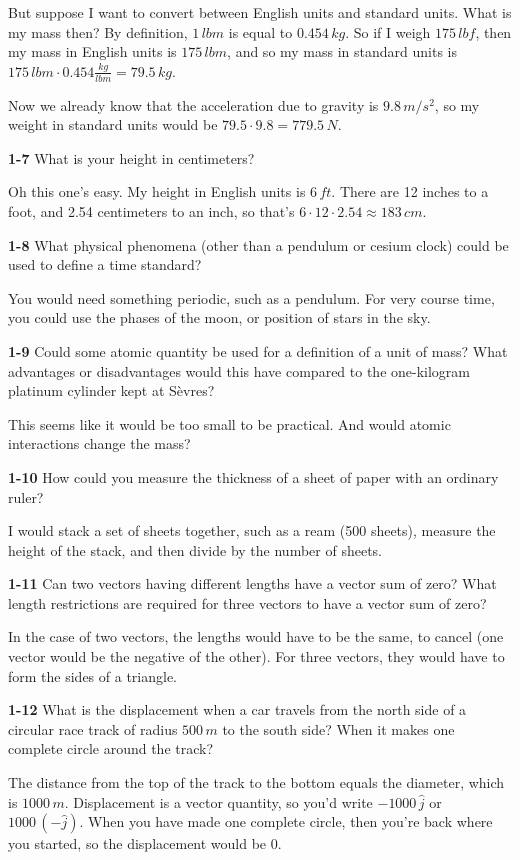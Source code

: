\documentclass{amsart}
\begin{document}
But suppose I want to convert between English units and standard units.
What is my mass then?
By definition, $1 \, lbm$ is equal to $0.454 \, kg$.
So if I weigh $175 \, lbf$, then my mass in English units is $175 \, lbm$,
and so my mass in standard units is $175 \, lbm \cdot 0.454 \frac{kg}{lbm} = 79.5 \, kg$.

Now we already know that the acceleration due to gravity is $9.8 \, m/s^{2}$,
so my weight in standard units would be $79.5 \cdot 9.8 = 779.5 \, N$.

\textbf{1-7} What is your height in centimeters?

Oh this one's easy.  My height in English units is $6 \, ft$.
There are 12 inches to a foot, and 2.54 centimeters to an inch,
so that's $6 \cdot 12 \cdot 2.54 \approx 183 \, cm$.

\textbf{1-8} What physical phenomena (other than a pendulum or cesium clock)
could be used to define a time standard?

You would need something periodic, such as a pendulum.  For very course time,
you could use the phases of the moon, or position of stars in the sky.

\textbf{1-9} Could some atomic quantity be used for a definition of a unit of mass?
What advantages or disadvantages would this have compared to the one-kilogram platinum
cylinder kept at S\`{e}vres?

This seems like it would be too small to be practical.
And would atomic interactions change the mass?

\textbf{1-10} How could you measure the thickness of a sheet of paper with an ordinary ruler?

I would stack a set of sheets together, such as a ream (500 sheets), measure the height of the stack,
and then divide by the number of sheets.

\textbf{1-11} Can two vectors having different lengths have a vector sum of zero?
What length restrictions are required for three vectors to have a vector sum of zero?

In the case of two vectors, the lengths would have to be the same, to cancel (one vector
would be the negative of the other).
For three vectors, they would have to form the sides of a triangle.

\textbf{1-12} What is the displacement when a car travels from the north side of a circular
race track of radius $500 \, m$ to the south side?
When it makes one complete circle around the track?

The distance from the top of the track to the bottom equals the diameter, which is $1000 \, m$.
Displacement is a vector quantity, so you'd write $-1000 \, \hat j$ or $1000 \, (- \hat j)$.
When you have made one complete circle, then you're back where you started, so the displacement
would be 0.
\end{document}
